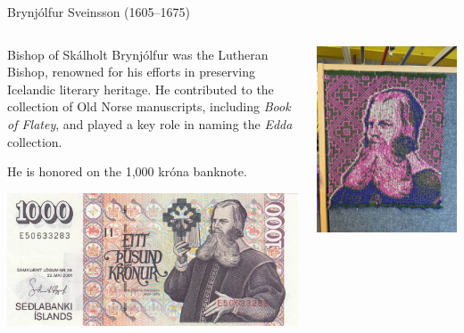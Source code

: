 \documentclass[
    NAME={Dr. Helga Ingimundardóttir},
    EMAIL={helgaingim@hi.is},
    FACULTY={Industrial Engineering},
    TITLE={HiDef Textiles: Reviving Tradition with Innovation},
    SUBTITLE={Empowering Creativity and Sustainability in Textile Production through Digital Transformation},
    SEMINAR={Reykjavík DataBeers},
    DATE={January 25, 2025},
    WIDE={true}
]{HI-LaTeX/hi-beamer}
\begin{document}
    \begin{frame}{Brynjólfur Sveinsson (1605–1675)}
        \begin{columns}
            \begin{column}{.65\linewidth}
                \begin{block}{Bishop of Skálholt}
                    Brynjólfur was the Lutheran Bishop, renowned for his efforts in preserving Icelandic literary heritage. He contributed to the collection of Old Norse manuscripts, including \emph{Book of Flatey}, and played a key role in naming the \emph{Edda} collection.

                    He is honored on the 1,000 króna banknote.
                \end{block}
                \centering
                \includegraphics[width=.5\linewidth]{include/1000kr.JPG}
            \end{column}
            \begin{column}{.35\linewidth}
                \includegraphics[height=.75\textheight]{include/sveinsson.jpg}
            \end{column}


        \end{columns}

\end{frame}
\end{document}
